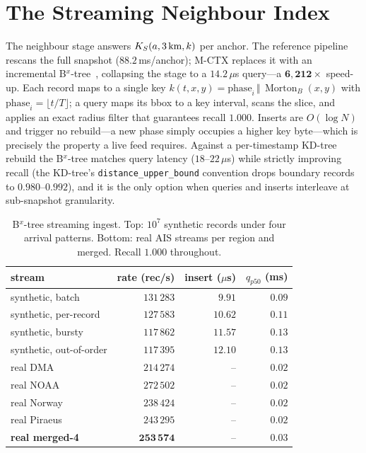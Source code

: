 \section{The Streaming Neighbour Index}\label{sec:neighbor}

The neighbour stage answers $K_S(a,3\text{\,km},k)$ per anchor. The
reference pipeline rescans the full snapshot ($88.2$\,ms/anchor); M-CTX
replaces it with an incremental B$^{x}$-tree~\cite{jensen2004bx},
collapsing the stage to a $14.2$\,$\mu$s query---a
$\mathbf{6{,}212\times}$ speed-up. Each record maps to a single key
$k(t,x,y)=\mathrm{phase}_i\,\Vert\,\operatorname{Morton}_B(x,y)$ with
$\mathrm{phase}_i=\lfloor t/T\rfloor$; a query maps its bbox to a key
interval, scans the slice, and applies an exact radius filter that
guarantees recall $1.000$. Inserts are $O(\log N)$ and trigger no
rebuild---a new phase simply occupies a higher key byte---which is
precisely the property a live feed requires. Against a per-timestamp
KD-tree rebuild the B$^{x}$-tree matches query latency
($18$--$22$\,$\mu$s) while strictly improving recall (the KD-tree's
\texttt{distance\_upper\_bound} convention drops boundary records to
$0.980$--$0.992$), and it is the only option when queries and inserts
interleave at sub-snapshot granularity.

\begin{table}[t]
\centering
\caption{B$^{x}$-tree streaming ingest. Top: $10^{7}$ synthetic records
under four arrival patterns. Bottom: real AIS streams per region and
merged. Recall $1.000$ throughout.}\label{tab:stream}
\small
\begin{tabular}{lrrr}
\toprule
stream & rate (rec/s) & insert ($\mu$s) & $q_{p50}$ (ms)\\
\midrule
synthetic, batch        & $131\,283$ & $9.91$  & $0.09$ \\
synthetic, per-record   & $127\,583$ & $10.62$ & $0.11$ \\
synthetic, bursty       & $117\,862$ & $11.57$ & $0.13$ \\
synthetic, out-of-order & $117\,395$ & $12.10$ & $0.13$ \\
\midrule
real DMA                & $214\,274$ & --      & $0.02$ \\
real NOAA               & $272\,502$ & --      & $0.02$ \\
real Norway             & $238\,424$ & --      & $0.02$ \\
real Piraeus            & $243\,295$ & --      & $0.02$ \\
\textbf{real merged-4}  & $\mathbf{253\,574}$ & -- & $0.03$ \\
\bottomrule
\end{tabular}
\end{table}

